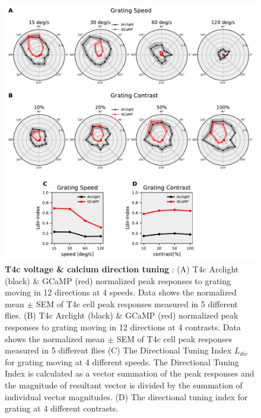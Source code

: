 \documentclass[9pt,lineno]{elife}
\begin{document}
\begin{figure}
\begin{fullwidth}
\includegraphics[width=0.84\linewidth]{figure3}
\caption{\textbf{T4c voltage \& calcium direction tuning} : (A) T4c Arclight (black) \& GCaMP (red) normalized peak responses to grating moving in 12 directions at 4 speeds. Data shows the normalized mean $\pm$ SEM of T4c cell peak responses measured in 5 different flies. (B) T4c Arclight (black) \& GCaMP (red) normalized peak responses to grating moving in 12 directions at 4 contrasts. Data shows the normalized mean $\pm$ SEM of T4c cell peak responses measured in 5 different flies (C) The Directional Tuning Index $L_{dir}$ for grating moving at 4 different speeds. The Directional Tuning Index is calculated as a vector summation of the peak responses and the magnitude of resultant vector is divided by the summation of individual vector magnitudes. (D) The directional tuning index for grating at 4 different contrasts.}

\label{DirTuning}
	
\end{fullwidth}
\end{figure} 
\end{document}
